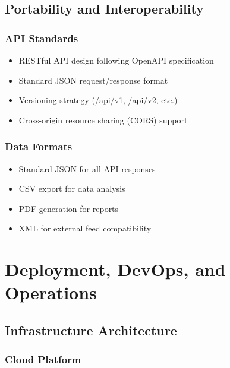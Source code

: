 \documentclass[12pt,a4paper]{report}
\begin{document}
\section{Portability and Interoperability}

\subsection{API Standards}

\begin{itemize}[label=\textbullet]
    \item RESTful API design following OpenAPI specification
    \item Standard JSON request/response format
    \item Versioning strategy (/api/v1, /api/v2, etc.)
    \item Cross-origin resource sharing (CORS) support
\end{itemize}

\subsection{Data Formats}

\begin{itemize}[label=\textbullet]
    \item Standard JSON for all API responses
    \item CSV export for data analysis
    \item PDF generation for reports
    \item XML for external feed compatibility
\end{itemize}

\newpage

\chapter{Deployment, DevOps, and Operations}

\section{Infrastructure Architecture}

\subsection{Cloud Platform}
\end{document}
